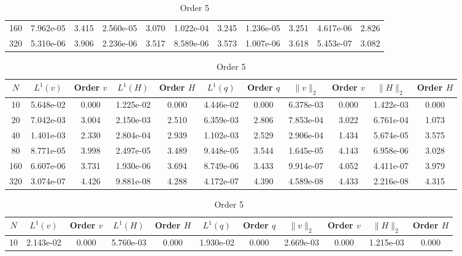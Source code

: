 \documentclass[english]{article}
\theoremstyle{thmstyleone}
\theoremstyle{thmstyletwo}
\theoremstyle{thmstylethree}
\begin{document}
\begin{table}[ht]
\begin{adjustbox}{width=1\textwidth}
\begin{subtable}{1.\linewidth}
\begin{tabular}{ccccccccccc}
				160 & 7.962e-05 & 3.415 & 2.560e-05 & 3.070 & 1.022e-04 & 3.245 & 1.236e-05 & 3.251 & 4.617e-06 & 2.826 \\
				320 & 5.310e-06 & 3.906 & 2.236e-06 & 3.517 & 8.589e-06 & 3.573 & 1.007e-06 & 3.618 & 5.453e-07 & 3.082 \\
				\bottomrule
			\end{tabular}
		\end{subtable}
	\end{adjustbox}
	\begin{adjustbox}{width=1\textwidth}
		\small
		\begin{subtable}{1.\linewidth}
			\centering
			\caption{Order 4}
			\begin{tabular}{ccccccccccc}
				\toprule
				$N$ & $L^1(v)$ & Order $v$ & $L^1(H)$ & Order $H$ & $L^1(q)$ & Order $q$ & $\|v\|_2$ & Order $v$ & $\|H\|_2$ & Order $H$ \\
				\midrule
				10 & 5.648e-02 & 0.000 & 1.225e-02 & 0.000 & 4.446e-02 & 0.000 & 6.378e-03 & 0.000 & 1.422e-03 & 0.000 \\
				20 & 7.042e-03 & 3.004 & 2.150e-03 & 2.510 & 6.359e-03 & 2.806 & 7.853e-04 & 3.022 & 6.761e-04 & 1.073 \\
				40 & 1.401e-03 & 2.330 & 2.804e-04 & 2.939 & 1.102e-03 & 2.529 & 2.906e-04 & 1.434 & 5.674e-05 & 3.575 \\
				80 & 8.771e-05 & 3.998 & 2.497e-05 & 3.489 & 9.448e-05 & 3.544 & 1.645e-05 & 4.143 & 6.958e-06 & 3.028 \\
				160 & 6.607e-06 & 3.731 & 1.930e-06 & 3.694 & 8.749e-06 & 3.433 & 9.914e-07 & 4.052 & 4.411e-07 & 3.979 \\
				320 & 3.074e-07 & 4.426 & 9.881e-08 & 4.288 & 4.172e-07 & 4.390 & 4.589e-08 & 4.433 & 2.216e-08 & 4.315 \\
				\bottomrule
			\end{tabular}
		\end{subtable}
	\end{adjustbox}
	\begin{adjustbox}{width=1\textwidth}
		\small
		\begin{subtable}{1.\linewidth}
			\centering
			\caption{Order 5}
			\begin{tabular}{ccccccccccc}
				\toprule
				$N$ & $L^1(v)$ & Order $v$ & $L^1(H)$ & Order $H$ & $L^1(q)$ & Order $q$ & $\|v\|_2$ & Order $v$ & $\|H\|_2$ & Order $H$ \\
				\midrule
				10 & 2.143e-02 & 0.000 & 5.760e-03 & 0.000 & 1.930e-02 & 0.000 & 2.669e-03 & 0.000 & 1.215e-03 & 0.000 \\

\end{tabular}
\end{subtable}
\end{adjustbox}
\end{table}
\end{document}
